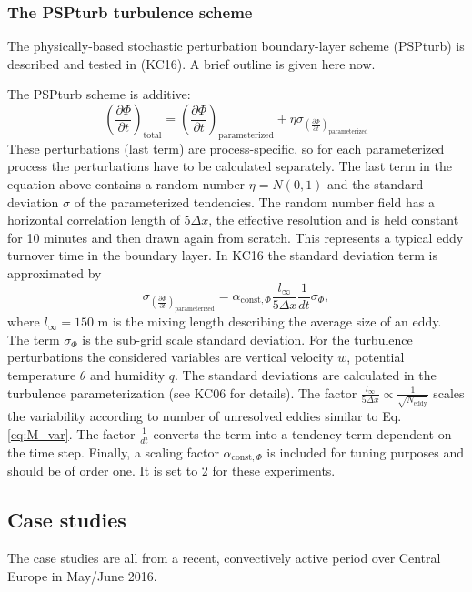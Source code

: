 \documentclass[a4paper, 12pt]{article}
\begin{document}
\subsubsection{The PSPturb turbulence scheme}
The physically-based stochastic perturbation boundary-layer scheme (PSPturb) is described and tested in \cite{Kober2016}(KC16). A brief outline is given here now. 

The PSPturb scheme is additive:
\begin{equation} \label{eq:PSPturb_additive}
\left( \frac{\partial \Phi}{\partial t} \right)_{\mathrm{total}} = \left( \frac{\partial \Phi}{\partial t} \right)_{\mathrm{parameterized}} + \eta \sigma_{\left( \frac{\partial \Phi}{\partial t} \right)_{\mathrm{parameterized}}}
\end{equation}
These perturbations (last term) are process-specific, so for each parameterized process the perturbations have to be calculated separately. The last term in the equation above contains a random number $\eta = \mathit{N}(0,1)$ and the standard deviation $\sigma$ of the parameterized tendencies. The random number field has a horizontal correlation length of 5$\Delta x$, the effective resolution and is held constant for 10 minutes and then drawn again from scratch. This represents a typical eddy turnover time in the boundary layer. In KC16 the standard deviation term is approximated by
\begin{equation} \label{eq:PSPturb_std}
\sigma_{\left( \frac{\partial \Phi}{\partial t} \right)_{\mathrm{parameterized}}} = \alpha_{\mathrm{const}, \Phi} \frac{\mathit{l_{\infty}}}{5 \Delta x}\frac{1}{dt} \sigma_{\Phi},
\end{equation}
where $\mathit{l_{\infty}} = 150$ m is the mixing length describing the average size of an eddy. The term $\sigma_{\Phi}$ is the sub-grid scale standard deviation. For the turbulence perturbations the considered variables are vertical velocity $w$, potential temperature $\theta$ and humidity $q$. The standard deviations are calculated in the turbulence parameterization (see KC06 for details). The factor $\frac{\mathit{l_{\infty}}}{5 \Delta x} \propto \frac{1}{\sqrt{N_{\mathrm{eddy}}}}$ scales the variability according to number of unresolved eddies similar to Eq. \ref{eq:M_var}. The factor $\frac{1}{dt}$  converts the term into a tendency term dependent on the time step. Finally, a scaling factor $\alpha_{\mathrm{const}, \Phi}$ is included for tuning purposes and should be of order one. It is set to 2 for these experiments. 

\subsection{Case studies}
The case studies are all from a recent, convectively active period over Central Europe in May/June 2016.  
\end{document}
